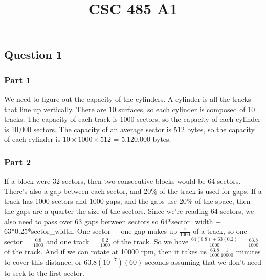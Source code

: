 \documentclass[
  letterpaper,
  DIV=11,
  numbers=noendperiod]{scrartcl}
\title{CSC 485 A1}
\author{}
\date{}
\begin{document}
\maketitle
\ifdefined\Shaded\renewenvironment{Shaded}{\begin{tcolorbox}[sharp corners, breakable, borderline west={3pt}{0pt}{shadecolor}, enhanced, interior hidden, frame hidden, boxrule=0pt]}{\end{tcolorbox}}\fi

\hypertarget{question-1}{%
\subsection{Question 1}\label{question-1}}

\hypertarget{part-1}{%
\subsubsection{Part 1}\label{part-1}}

We need to figure out the capacity of the cylinders. A cylinder is all
the tracks that line up vertically. There are 10 surfaces, so each
cylinder is composed of 10 tracks. The capacity of each track is 1000
sectors, so the capacity of each cylinder is 10,000 sectors. The
capacity of an average sector is 512 bytes, so the capacity of each
cylinder is \(10 \times 1000 \times 512\) = 5,120,000 bytes.

\hypertarget{part-2}{%
\subsubsection{Part 2}\label{part-2}}

If a block were 32 sectors, then two consecutive blocks would be 64
sectors. There's also a gap between each sector, and 20\% of the track
is used for gaps. If a track has 1000 sectors and 1000 gaps, and the
gaps use 20\% of the space, then the gaps are a quarter the size of the
sectors. Since we're reading 64 sectors, we also need to pass over 63
gaps between sectors so 64*sector\_width + 63*0.25*sector\_width. One
sector + one gap makes up \(\frac{1}{1000}\) of a track, so one sector =
\(\frac{0.8}{1000}\) and one track = \(\frac{0.2}{1000}\) of the track.
So we have \(\frac{64(0.8) + 63(0.2)}{1000} = \frac{63.8}{1000}\) of the
track. And if we can rotate at 10000 rpm, then it takes us
\(\frac{63.8}{1000} \frac{1}{10000}\) minutes to cover this distance, or
\(63.8(10^{-7})(60)\) seconds assuming that we don't need to seek to the
first sector.
\end{document}

